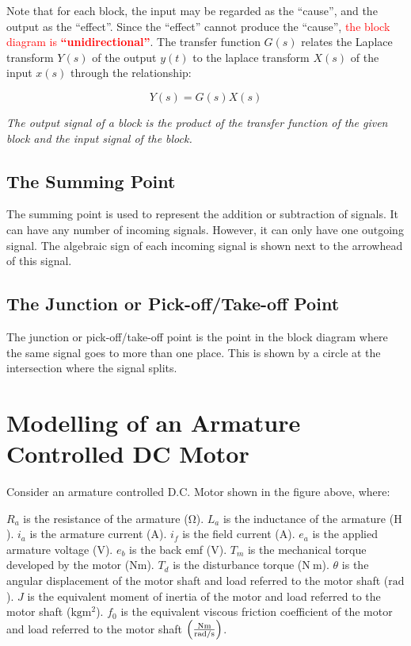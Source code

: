\documentclass[
  14pt,
  a4paper,
  oneside,
  open=any,
  a4paper,
  14pt]{report}
\providecommand{\tightlist}{%
  \setlength{\itemsep}{0pt}\setlength{\parskip}{0pt}}\usepackage{longtable,booktabs,array}
\begin{document}
Note that for each block, the input may be regarded as the ``cause'',
and the output as the ``effect''. Since the ``effect'' cannot produce
the ``cause'', \textcolor{red}{the block diagram is
\textbf{``unidirectional''}}. The transfer function \(G(s)\) relates the
Laplace transform \(Y(s)\) of the output \(y(t)\) to the laplace
transform \(X(s)\) of the input \(x(s)\) through the relationship:

\[
    Y(s) = G(s)X(s)
\]

\begin{description}
\tightlist
\item[Main Block Diagram Rule]
\emph{The output signal of a block is the product of the transfer
function of the given block and the input signal of the block.}
\end{description}

\subsection{The Summing Point}\label{the-summing-point}

The summing point is used to represent the addition or subtraction of
signals. It can have any number of incoming signals. However, it can
only have one outgoing signal. The algebraic sign of each incoming
signal is shown next to the arrowhead of this signal.

\subsection{The Junction or Pick-off/Take-off
Point}\label{the-junction-or-pick-offtake-off-point}

The junction or pick-off/take-off point is the point in the block
diagram where the same signal goes to more than one place. This is shown
by a circle at the intersection where the signal splits.

\section{Modelling of an Armature Controlled DC
Motor}\label{modelling-of-an-armature-controlled-dc-motor}

Consider an armature controlled D.C. Motor shown in the figure above,
where:

\(R_a\) is the resistance of the armature (\(\unit{\ohm}\)). \(L_a\) is
the inductance of the armature (\(\unit{\henry}\)). \(i_a\) is the
armature current (\(\unit{\ampere}\)). \(i_f\) is the field current
(\(\unit{\ampere}\)). \(e_a\) is the applied armature voltage
(\(\unit{\volt}\)). \(e_b\) is the back emf (\(\unit{\volt}\)). \(T_m\)
is the mechanical torque developed by the motor
(\(\unit{\newton\meter}\)). \(T_d\) is the disturbance torque
(\(\unit{\newton~\meter}\)). \(\theta\) is the angular displacement of
the motor shaft and load referred to the motor shaft
(\(\unit{\radian}\)). \(J\) is the equivalent moment of inertia of the
motor and load referred to the motor shaft
(\(\unit{\kilogram\square\meter}\)). \(f_0\) is the equivalent viscous
friction coefficient of the motor and load referred to the motor shaft
\(\left(\unit{\frac{\newton\meter}{\radian\per\second}}\right)\).
\end{document}
